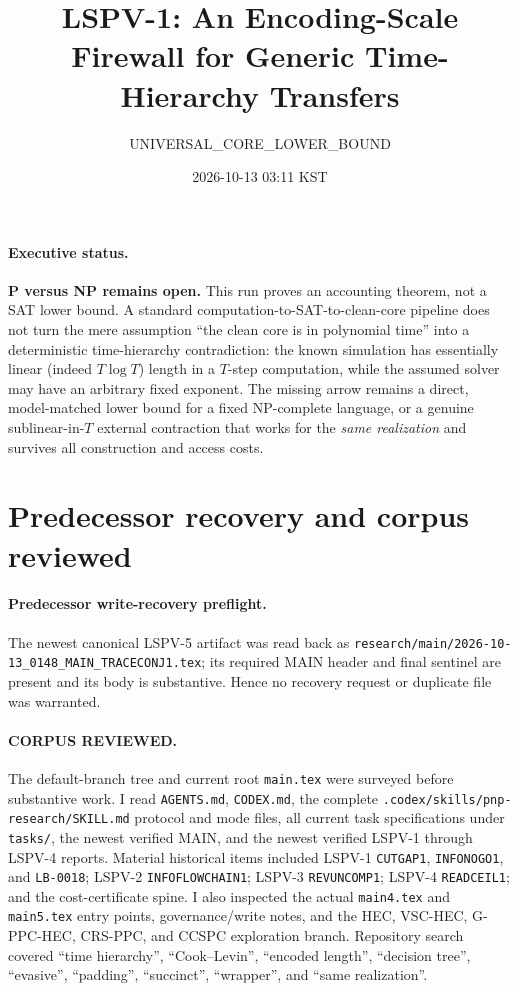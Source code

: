 \documentclass[11pt]{article}
\title{LSPV-1: An Encoding-Scale Firewall for Generic Time-Hierarchy Transfers}
\author{UNIVERSAL\_CORE\_LOWER\_BOUND}
\date{2026-10-13 03:11 KST}
\begin{document}
\maketitle

\paragraph{Executive status.}
\textbf{P versus NP remains open.}  This run proves an accounting theorem, not a
SAT lower bound.  A standard computation-to-SAT-to-clean-core pipeline does not
turn the mere assumption ``the clean core is in polynomial time'' into a
deterministic time-hierarchy contradiction: the known simulation has essentially
linear (indeed $T\log T$) length in a $T$-step computation, while the assumed
solver may have an arbitrary fixed exponent.  The missing arrow remains a direct,
model-matched lower bound for a fixed NP-complete language, or a genuine
sublinear-in-$T$ external contraction that works for the \emph{same realization}
and survives all construction and access costs.

\section{Predecessor recovery and corpus reviewed}
\paragraph{Predecessor write-recovery preflight.}
The newest canonical LSPV-5 artifact was read back as
\texttt{research/main/2026-10-13\_0148\_MAIN\_TRACECONJ1.tex}; its required MAIN
header and final sentinel are present and its body is substantive.  Hence no
recovery request or duplicate file was warranted.

\paragraph{CORPUS REVIEWED.}
The default-branch tree and current root \texttt{main.tex} were surveyed before
substantive work.  I read \texttt{AGENTS.md}, \texttt{CODEX.md}, the complete
\texttt{.codex/skills/pnp-research/SKILL.md} protocol and mode files, all current
task specifications under \texttt{tasks/}, the newest verified MAIN, and the
newest verified LSPV-1 through LSPV-4 reports.  Material historical items included
LSPV-1 \texttt{CUTGAP1}, \texttt{INFONOGO1}, and \texttt{LB-0018}; LSPV-2
\texttt{INFOFLOWCHAIN1}; LSPV-3 \texttt{REVUNCOMP1}; LSPV-4
\texttt{READCEIL1}; and the cost-certificate spine.  I also inspected the actual
\texttt{main4.tex} and \texttt{main5.tex} entry points, governance/write notes,
and the HEC, VSC-HEC, G-PPC-HEC, CRS-PPC, and CCSPC exploration branch.  Repository
search covered ``time hierarchy'', ``Cook--Levin'', ``encoded length'',
``decision tree'', ``evasive'', ``padding'', ``succinct'', ``wrapper'', and
``same realization''.
\end{document}
